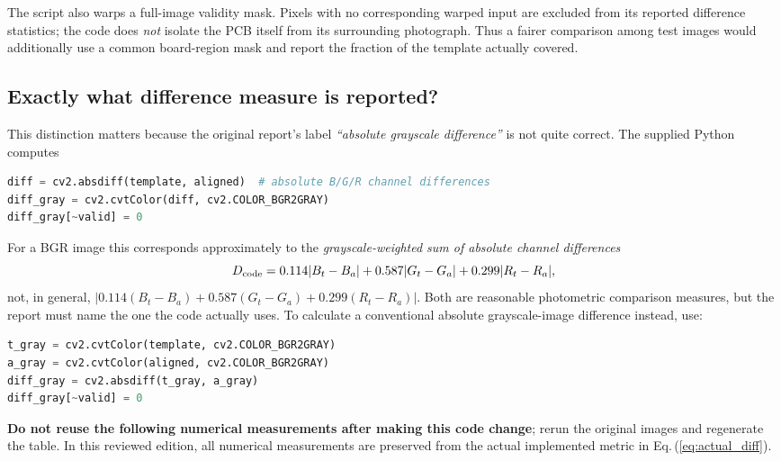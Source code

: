 \documentclass[11pt,a4paper]{article}
\begin{document}
The script also warps a full-image validity mask. Pixels with no corresponding warped input are excluded from its reported difference statistics; the code does \emph{not} isolate the PCB itself from its surrounding photograph. Thus a fairer comparison among test images would additionally use a common board-region mask and report the fraction of the template actually covered.

\subsection{Exactly what difference measure is reported?}
This distinction matters because the original report's label \emph{``absolute grayscale difference''} is not quite correct. The supplied Python computes
\begin{lstlisting}[language=Python]
diff = cv2.absdiff(template, aligned)  # absolute B/G/R channel differences
diff_gray = cv2.cvtColor(diff, cv2.COLOR_BGR2GRAY)
diff_gray[~valid] = 0
\end{lstlisting}
For a BGR image this corresponds approximately to the \emph{grayscale-weighted sum of absolute channel differences}
\begin{equation}
 D_{\rm code}=0.114|B_t-B_a|+0.587|G_t-G_a|+0.299|R_t-R_a|,
\label{eq:actual_diff}
\end{equation}
not, in general, $\left|0.114(B_t-B_a)+0.587(G_t-G_a)+0.299(R_t-R_a)\right|$. Both are reasonable photometric comparison measures, but the report must name the one the code actually uses. To calculate a conventional absolute grayscale-image difference instead, use:
\begin{lstlisting}[language=Python]
t_gray = cv2.cvtColor(template, cv2.COLOR_BGR2GRAY)
a_gray = cv2.cvtColor(aligned, cv2.COLOR_BGR2GRAY)
diff_gray = cv2.absdiff(t_gray, a_gray)
diff_gray[~valid] = 0
\end{lstlisting}
\textbf{Do not reuse the following numerical measurements after making this code change}; rerun the original images and regenerate the table. In this reviewed edition, all numerical measurements are preserved from the actual implemented metric in Eq.\,(\ref{eq:actual_diff}).
\end{document}
